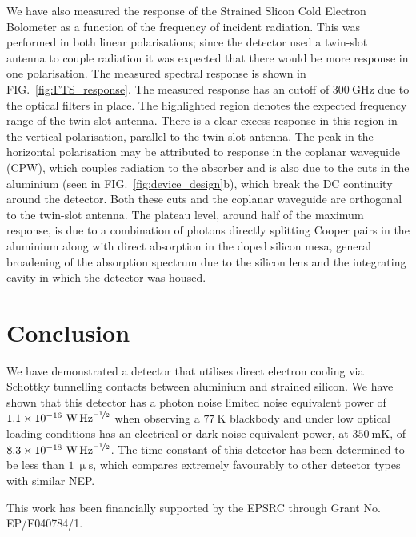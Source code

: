\documentclass[aip, apl, a4paper, amsmath,amssymb, reprint]{revtex4-1}
\begin{document}
We have also measured the response of the Strained Slicon Cold Electron Bolometer as a function of the frequency of incident radiation. This was performed in both linear polarisations; since the detector used a twin-slot antenna to couple radiation it was expected that there would be more response in one polarisation. The measured spectral response is shown in FIG.~\ref{fig:FTS_response}. The measured response has an cutoff of $300~\mathrm{GHz}$ due to the optical filters in place. The highlighted region denotes the expected frequency range of the twin-slot antenna. There is a clear excess response in this region in the vertical polarisation, parallel to the twin slot antenna. The peak in the horizontal polarisation may be attributed to response in the coplanar waveguide (CPW), which couples radiation to the absorber and is also due to the cuts in the aluminium (seen in FIG.~\ref{fig:device_design}b), which break the DC continuity around the detector. Both these cuts and the coplanar waveguide are orthogonal to the twin-slot antenna. The plateau level, around half of the maximum response, is due to a combination of photons directly splitting Cooper pairs in the aluminium along with direct absorption in the doped silicon mesa, general broadening of the absorption spectrum due to the silicon lens and the integrating cavity in which the detector was housed.

\section{Conclusion}\label{sec:conclusion}
We have demonstrated a detector that utilises direct electron cooling via Schottky tunnelling contacts between aluminium and strained silicon. We have shown that this detector has a photon noise limited noise equivalent power of $1.1 \times 10^{-16}~\mathrm{\mbox{W\,Hz}^{\nicefrac{-1}{2}}}$ when observing a  $77~\mathrm{K}$ blackbody and under low optical loading conditions has an electrical or dark noise equivalent power, at $350~\mathrm{mK}$, of $8.3 \times 10^{-18}~\mathrm{\mbox{W\,Hz}^{\nicefrac{-1}{2}}}$. The time constant of this detector has been determined to be less than $1~\mathrm{\upmu s}$, which compares extremely favourably to other detector types with similar NEP.

This work has been financially supported by the EPSRC through Grant No. EP/F040784/1.

\end{document}
